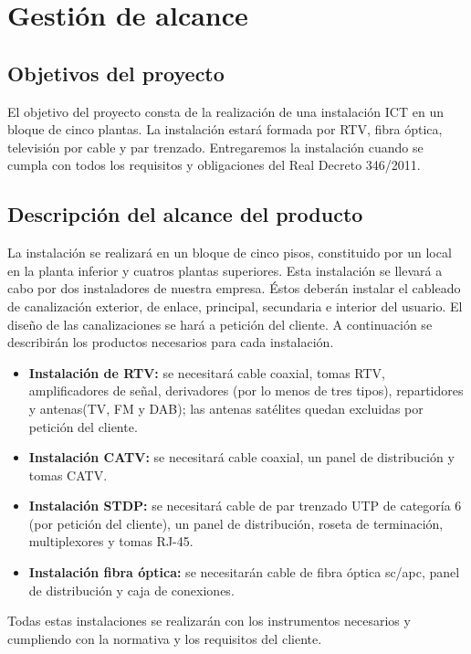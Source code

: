\chapter{Gestión de alcance}



\section{Objetivos del proyecto}
El objetivo del proyecto consta de la realización de una instalación ICT en un bloque de cinco plantas. La instalación estará formada por RTV, fibra óptica, televisión por cable y par trenzado. Entregaremos la instalación cuando se cumpla con todos los requisitos y obligaciones del Real Decreto 346/2011.

\section{Descripción del alcance del producto}
La instalación se realizará en un bloque de cinco pisos, constituido por un local en la planta inferior y cuatros plantas superiores. Esta instalación se llevará a cabo por dos instaladores de nuestra empresa. Éstos deberán instalar el cableado de canalización exterior, de enlace, principal, secundaria e interior del usuario. El diseño de las canalizaciones se hará a petición del cliente. A continuación se describirán los productos necesarios para cada instalación.
\begin{itemize}
\item \textbf{Instalación de RTV:} se necesitará cable coaxial, tomas RTV, amplificadores de señal, derivadores (por lo menos de tres tipos), repartidores y antenas(TV, FM y DAB); las antenas satélites quedan excluidas por petición del cliente.
\item \textbf{Instalación CATV:} se necesitará cable coaxial, un panel de distribución y tomas CATV.
\item \textbf{Instalación STDP:} se necesitará cable de par trenzado UTP de categoría 6 (por petición del cliente), un panel de distribución, roseta de terminación, multiplexores y tomas RJ-45.
\item \textbf{Instalación fibra óptica:} se necesitarán cable de fibra óptica sc/apc, panel de distribución y caja de conexiones.
\end{itemize}
Todas estas instalaciones se realizarán con los instrumentos necesarios y cumpliendo con la normativa y los requisitos del cliente.

